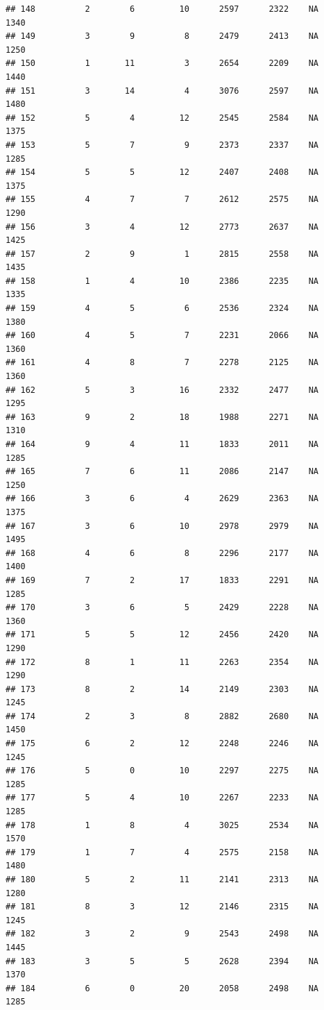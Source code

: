 \documentclass[]{book}
\begin{document}
\begin{verbatim}
## 148          2        6         10      2597      2322    NA    1340
## 149          3        9          8      2479      2413    NA    1250
## 150          1       11          3      2654      2209    NA    1440
## 151          3       14          4      3076      2597    NA    1480
## 152          5        4         12      2545      2584    NA    1375
## 153          5        7          9      2373      2337    NA    1285
## 154          5        5         12      2407      2408    NA    1375
## 155          4        7          7      2612      2575    NA    1290
## 156          3        4         12      2773      2637    NA    1425
## 157          2        9          1      2815      2558    NA    1435
## 158          1        4         10      2386      2235    NA    1335
## 159          4        5          6      2536      2324    NA    1380
## 160          4        5          7      2231      2066    NA    1360
## 161          4        8          7      2278      2125    NA    1360
## 162          5        3         16      2332      2477    NA    1295
## 163          9        2         18      1988      2271    NA    1310
## 164          9        4         11      1833      2011    NA    1285
## 165          7        6         11      2086      2147    NA    1250
## 166          3        6          4      2629      2363    NA    1375
## 167          3        6         10      2978      2979    NA    1495
## 168          4        6          8      2296      2177    NA    1400
## 169          7        2         17      1833      2291    NA    1285
## 170          3        6          5      2429      2228    NA    1360
## 171          5        5         12      2456      2420    NA    1290
## 172          8        1         11      2263      2354    NA    1290
## 173          8        2         14      2149      2303    NA    1245
## 174          2        3          8      2882      2680    NA    1450
## 175          6        2         12      2248      2246    NA    1245
## 176          5        0         10      2297      2275    NA    1285
## 177          5        4         10      2267      2233    NA    1285
## 178          1        8          4      3025      2534    NA    1570
## 179          1        7          4      2575      2158    NA    1480
## 180          5        2         11      2141      2313    NA    1280
## 181          8        3         12      2146      2315    NA    1245
## 182          3        2          9      2543      2498    NA    1445
## 183          3        5          5      2628      2394    NA    1370
## 184          6        0         20      2058      2498    NA    1285

\end{verbatim}
\end{document}
